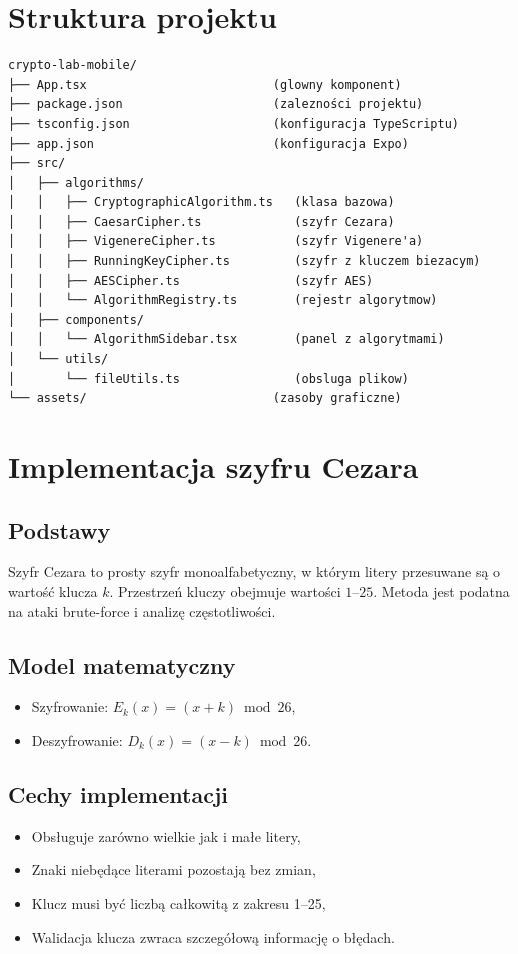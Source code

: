 \documentclass[12pt,a4paper]{article}
\begin{document}
\section{Struktura projektu}
\begin{lstlisting}
crypto-lab-mobile/
├── App.tsx                          (glowny komponent)
├── package.json                     (zalezności projektu)
├── tsconfig.json                    (konfiguracja TypeScriptu)
├── app.json                         (konfiguracja Expo)
├── src/
│   ├── algorithms/
│   │   ├── CryptographicAlgorithm.ts   (klasa bazowa)
│   │   ├── CaesarCipher.ts             (szyfr Cezara)
│   │   ├── VigenereCipher.ts           (szyfr Vigenere'a)
│   │   ├── RunningKeyCipher.ts         (szyfr z kluczem biezacym)
│   │   ├── AESCipher.ts                (szyfr AES)
│   │   └── AlgorithmRegistry.ts        (rejestr algorytmow)
│   ├── components/
│   │   └── AlgorithmSidebar.tsx        (panel z algorytmami)
│   └── utils/
│       └── fileUtils.ts                (obsluga plikow)
└── assets/                          (zasoby graficzne)
\end{lstlisting}
\section{Implementacja szyfru Cezara}
\subsection{Podstawy}
Szyfr Cezara to prosty szyfr monoalfabetyczny, w którym litery przesuwane są o wartość klucza $k$. 
Przestrzeń kluczy obejmuje wartości $1$--$25$. 
Metoda jest podatna na ataki brute-force i analizę częstotliwości.

\subsection{Model matematyczny}
\begin{itemize}
    \item Szyfrowanie: $E_k(x) = (x + k) \bmod 26$,
    \item Deszyfrowanie: $D_k(x) = (x - k) \bmod 26$.
\end{itemize}

\subsection{Cechy implementacji}
\begin{itemize}
    \item Obsługuje zarówno wielkie jak i małe litery,
    \item Znaki niebędące literami pozostają bez zmian,
    \item Klucz musi być liczbą całkowitą z zakresu 1--25,
    \item Walidacja klucza zwraca szczegółową informację o błędach.
\end{itemize}
\end{document}
